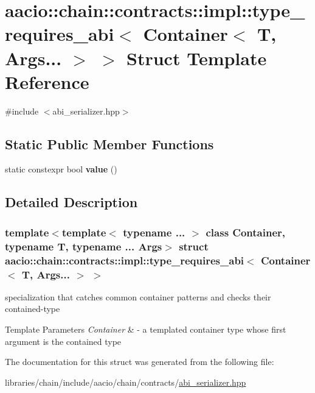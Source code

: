 \hypertarget{structaacio_1_1chain_1_1contracts_1_1impl_1_1type__requires__abi_3_01_container_3_01_t_00_01_args_8_8_8_01_4_01_4}{}\section{aacio\+:\+:chain\+:\+:contracts\+:\+:impl\+:\+:type\+\_\+requires\+\_\+abi$<$ Container$<$ T, Args... $>$ $>$ Struct Template Reference}
\label{structaacio_1_1chain_1_1contracts_1_1impl_1_1type__requires__abi_3_01_container_3_01_t_00_01_args_8_8_8_01_4_01_4}


{\ttfamily \#include $<$abi\+\_\+serializer.\+hpp$>$}

\subsection*{Static Public Member Functions}
\begin{DoxyCompactItemize}
\item 
\mbox{\label{structaacio_1_1chain_1_1contracts_1_1impl_1_1type__requires__abi_3_01_container_3_01_t_00_01_args_8_8_8_01_4_01_4_a4c44a872b8c850c4e6f3bd630e21ea72}} 
static constexpr bool {\bfseries value} ()
\end{DoxyCompactItemize}


\subsection{Detailed Description}
\subsubsection*{template$<$template$<$ typename ... $>$ class Container, typename T, typename ... Args$>$\newline
struct aacio\+::chain\+::contracts\+::impl\+::type\+\_\+requires\+\_\+abi$<$ Container$<$ T, Args... $>$ $>$}

specialization that catches common container patterns and checks their contained-\/type 
\begin{DoxyTemplParams}{Template Parameters}
{\em Container} & -\/ a templated container type whose first argument is the contained type \\
\hline
\end{DoxyTemplParams}


The documentation for this struct was generated from the following file\+:\begin{DoxyCompactItemize}
\item 
libraries/chain/include/aacio/chain/contracts/\mbox{\hyperlink{abi__serializer_8hpp}{abi\+\_\+serializer.\+hpp}}\end{DoxyCompactItemize}

